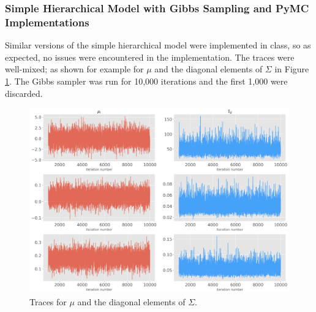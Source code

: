 \documentclass[paper=a4, fontsize=11pt]{scrartcl}
\begin{document}
\subsubsection{Simple Hierarchical Model with Gibbs Sampling and PyMC Implementations}
Similar versions of the simple hierarchical model were implemented in class, so as expected, no issues were encountered in the implementation. The traces were well-mixed; as shown for example for $\mu$ and the diagonal elements of $\Sigma$ in Figure  \ref{traces}. The Gibbs sampler was run for 10,000 iterations and the first 1,000 were discarded.\\

\begin{figure}[!htb]
\centering
\includegraphics[width=1\textwidth]{project/writeup/traces_simple_model.png}
\caption{Traces for $\mu$ and the diagonal elements of $\Sigma$.}
\label{traces}
\end{figure}
\end{document}
